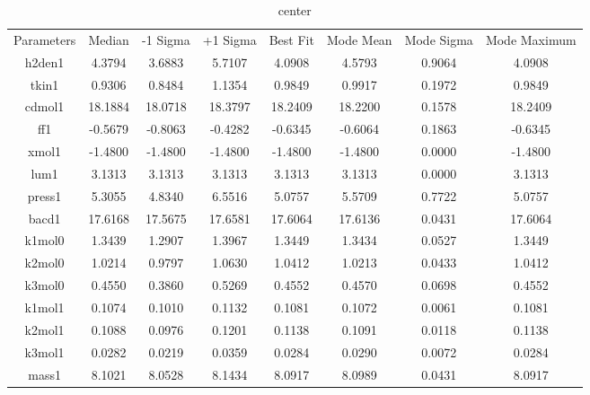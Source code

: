 \begin{table}
\caption{center}
\begin{tabular}{cccccccc}
Parameters & Median & -1 Sigma & +1 Sigma & Best Fit & Mode Mean & Mode Sigma & Mode Maximum \\
h2den1 & 4.3794 & 3.6883 & 5.7107 & 4.0908 & 4.5793 & 0.9064 & 4.0908 \\
tkin1 & 0.9306 & 0.8484 & 1.1354 & 0.9849 & 0.9917 & 0.1972 & 0.9849 \\
cdmol1 & 18.1884 & 18.0718 & 18.3797 & 18.2409 & 18.2200 & 0.1578 & 18.2409 \\
ff1 & -0.5679 & -0.8063 & -0.4282 & -0.6345 & -0.6064 & 0.1863 & -0.6345 \\
xmol1 & -1.4800 & -1.4800 & -1.4800 & -1.4800 & -1.4800 & 0.0000 & -1.4800 \\
lum1 & 3.1313 & 3.1313 & 3.1313 & 3.1313 & 3.1313 & 0.0000 & 3.1313 \\
press1 & 5.3055 & 4.8340 & 6.5516 & 5.0757 & 5.5709 & 0.7722 & 5.0757 \\
bacd1 & 17.6168 & 17.5675 & 17.6581 & 17.6064 & 17.6136 & 0.0431 & 17.6064 \\
k1mol0 & 1.3439 & 1.2907 & 1.3967 & 1.3449 & 1.3434 & 0.0527 & 1.3449 \\
k2mol0 & 1.0214 & 0.9797 & 1.0630 & 1.0412 & 1.0213 & 0.0433 & 1.0412 \\
k3mol0 & 0.4550 & 0.3860 & 0.5269 & 0.4552 & 0.4570 & 0.0698 & 0.4552 \\
k1mol1 & 0.1074 & 0.1010 & 0.1132 & 0.1081 & 0.1072 & 0.0061 & 0.1081 \\
k2mol1 & 0.1088 & 0.0976 & 0.1201 & 0.1138 & 0.1091 & 0.0118 & 0.1138 \\
k3mol1 & 0.0282 & 0.0219 & 0.0359 & 0.0284 & 0.0290 & 0.0072 & 0.0284 \\
mass1 & 8.1021 & 8.0528 & 8.1434 & 8.0917 & 8.0989 & 0.0431 & 8.0917 \\
\end{tabular}
\end{table}

